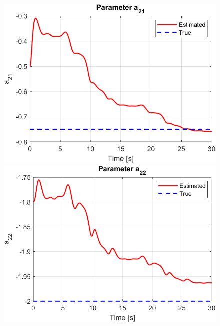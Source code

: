 \documentclass[12pt]{article} %
\numberwithin{equation}{section}  %
\begin{document}
\begin{figure}[ht!]
    \centering
    \begin{minipage}{0.48\textwidth}
        \centering
        \includegraphics[width=0.8\linewidth]{plots/plot3_c_a21.png}
    \end{minipage}
    \hfill
    \begin{minipage}{0.48\textwidth}
        \centering
        \includegraphics[width=0.8\linewidth]{plots/plot3_d_a22.png}
    \end{minipage}
    
    \caption{}
    \label{fig:A_est}
\end{figure}
\end{document}
